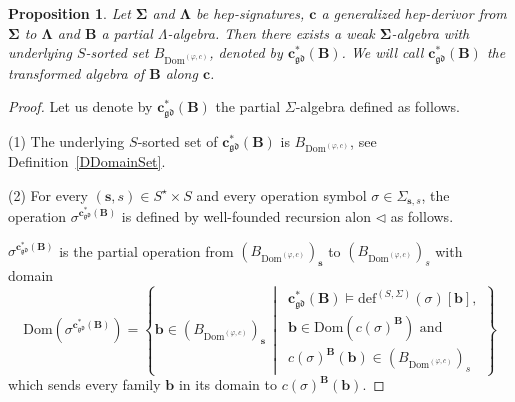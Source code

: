 \documentclass[a4paper, reqno
]{amsart}
\newcommand{\sig}[1]{\mathbf{#1}}             %
\newcommand{\Dom}{\mathrm{Dom}}
\newcommand{\gd}{\mathfrak{gd}}              %
\theoremstyle{plain}
\newtheorem{proposition}[theorem]{Proposition}
\theoremstyle{definition}
\begin{document}
\begin{proposition}\label{PTransformedAlg}
Let $\sig{\Sigma}$ and $\sig{\Lambda}$ be hep-signatures, $\mathbf{c}$ a generalized hep-derivor from $\sig{\Sigma}$ to $\sig{\Lambda}$ and $\mathbf{B}$ a partial $\Lambda$-algebra.
Then there exists a weak $\sig{\Sigma}$-algebra with underlying $S$-sorted set $B_{\Dom^{(\varphi,c)}}$, denoted by $\mathbf{c}^{\ast}_{\gd}(\mathbf{B})$.
We will call $\mathbf{c}^{\ast}_{\gd}(\mathbf{B})$ the \emph{transformed algebra} of $\mathbf{B}$ along $\mathbf{c}$.
\end{proposition}
\begin{proof}
Let us denote by $\mathbf{c}^{\ast}_{\gd}(\mathbf{B})$ the partial $\Sigma$-algebra defined as follows.

\textsf{(1)} The underlying $S$-sorted set of $\mathbf{c}^{\ast}_{\gd}(\mathbf{B})$ is $B_{\Dom^{(\varphi,c)}}$, see Definition~\ref{DDomainSet}.

\textsf{(2)} For every $(\mathbf{s},s)\in S^{\star}\times S$ and every operation symbol $\sigma\in\Sigma_{\mathbf{s},s}$, the operation $\sigma^{\mathbf{c}^{\ast}_{\gd}(\mathbf{B})}$ is defined by well-founded recursion alon $\lhd$ as follows.


$\sigma^{\mathbf{c}^{\ast}_{\gd}(\mathbf{B})}$ is the partial operation from $(B_{\Dom^{(\varphi,c)}})_{\mathbf{s}}$ to $(B_{\Dom^{(\varphi,c)}})_{s}$ with domain
$$
\Dom\left(\sigma^{\mathbf{c}^{\ast}_{\gd}(\mathbf{B})}\right)
=
\left\lbrace
\mathbf{b}\in\left(B_{\Dom^{(\varphi,c)}}\right)_{\mathbf{s}}
\,\middle|\,
\begin{array}{l}
\mathbf{c}^{\ast}_{\gd}(\mathbf{B})\models\mathrm{def}^{(S,\Sigma)}(\sigma)[\mathbf{b}],\\
\mathbf{b}\in\Dom\left(c(\sigma)^{\mathbf{B}}\right)\text{ and}\\
c(\sigma)^{\mathbf{B}}(\mathbf{b})\in\left(B_{\Dom^{(\varphi,c)}}\right)_{s}
\end{array}
\right\rbrace
$$
which sends every family $\mathbf{b}$ in its domain to $c(\sigma)^{\mathbf{B}}(\mathbf{b})$.



\end{proof}
\end{document}
